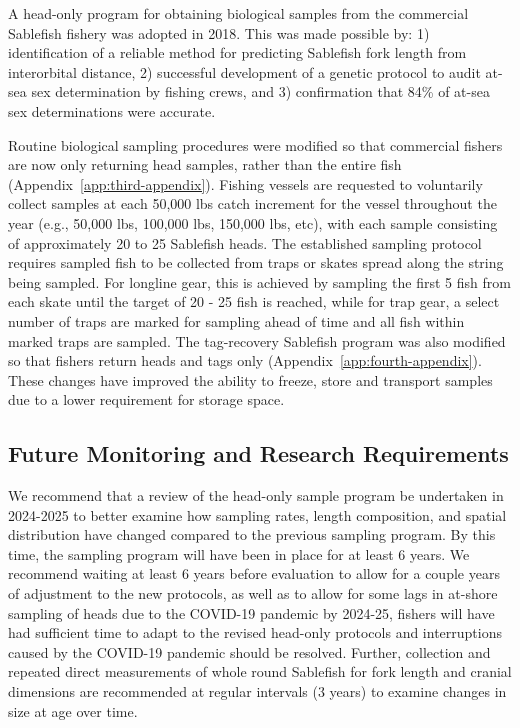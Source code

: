 \documentclass[12pt]{article}\usepackage[]{graphicx}\usepackage[]{color}
\begin{document}
A head-only program for obtaining biological samples from the commercial Sablefish fishery was adopted in 2018. This was made possible by: 1) identification of a reliable method for predicting Sablefish fork length from interorbital distance, 2) successful development of a genetic protocol to audit at-sea sex determination by fishing crews, and 3) confirmation that 84\% of at-sea sex determinations were accurate.

Routine biological sampling procedures were modified so that commercial fishers are now only returning head samples, rather than the entire fish (Appendix~\ref{app:third-appendix}). Fishing vessels are requested to voluntarily collect samples at each 50,000 lbs catch increment for the vessel throughout the year (e.g., 50,000 lbs, 100,000 lbs, 150,000 lbs, etc), with each sample consisting of approximately 20 to 25 Sablefish heads. The established sampling protocol requires sampled fish to be collected from traps or skates spread along the string being sampled. For longline gear, this is achieved by sampling the first 5 fish from each skate until the target of 20 - 25 fish is reached, while for trap gear, a select number of traps are marked for sampling ahead of time and all fish within marked traps are sampled. The tag-recovery Sablefish program was also modified so that fishers return heads and tags only (Appendix~\ref{app:fourth-appendix}). These changes have improved the ability to freeze, store and transport samples due to a lower requirement for storage space.

\hypertarget{future-monitoring-and-research-requirements}{%
\subsection{Future Monitoring and Research Requirements}\label{future-monitoring-and-research-requirements}}

We recommend that a review of the head-only sample program be undertaken in 2024-2025 to better examine how sampling rates, length composition, and spatial distribution have changed compared to the previous sampling program. By this time, the sampling program will have been in place for at least 6 years. We recommend waiting at least 6 years before evaluation to allow for a couple years of adjustment to the new protocols, as well as to allow for some lags in at-shore sampling of heads due to the COVID-19 pandemic by 2024-25, fishers will have had sufficient time to adapt to the revised head-only protocols and interruptions caused by the COVID-19 pandemic should be resolved. Further, collection and repeated direct measurements of whole round Sablefish for fork length and cranial dimensions are recommended at regular intervals (3 years) to examine changes in size at age over time.
\end{document}
